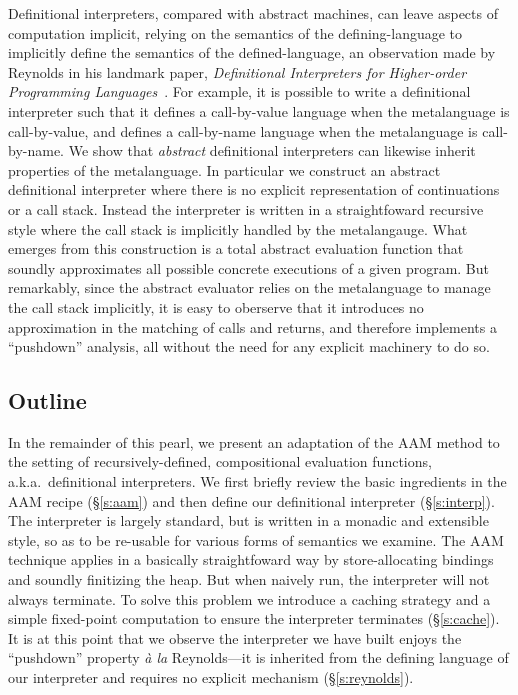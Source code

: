 Definitional interpreters, compared with abstract machines, can leave
aspects of computation implicit, relying on the semantics of the
defining-language to implicitly define the semantics of the
defined-language, an observation made by Reynolds in his landmark
paper, \emph{Definitional Interpreters for Higher-order Programming
  Languages}~\cite{dvanhorn:reynolds-acm72}.  For example, it is
possible to write a definitional interpreter such that it defines a
call-by-value language when the metalanguage is call-by-value, and
defines a call-by-name language when the metalanguage is call-by-name.
We show that \emph{abstract} definitional interpreters can likewise
inherit properties of the metalanguage.  In particular we construct an
abstract definitional interpreter where there is no explicit
representation of continuations or a call stack.  Instead the
interpreter is written in a straightfoward recursive style where the
call stack is implicitly handled by the metalangauge.  What emerges
from this construction is a total abstract evaluation function that
soundly approximates all possible concrete executions of a given
program.  But remarkably, since the abstract evaluator relies on the
metalanguage to manage the call stack implicitly, it is easy to
oberserve that it introduces no approximation in the matching of calls
and returns, and therefore implements a ``pushdown'' analysis, all
without the need for any explicit machinery to do so.

\subsection*{Outline}

In the remainder of this pearl, we present an adaptation of the AAM
method to the setting of recursively-defined, compositional evaluation
functions, a.k.a.~definitional interpreters.  We first briefly review
the basic ingredients in the AAM recipe (\S\ref{s:aam}) and then
define our definitional interpreter (\S\ref{s:interp}).  The
interpreter is largely standard, but is written in a monadic and
extensible style, so as to be re-usable for various forms of semantics
we examine.  The AAM technique applies in a basically straightfoward
way by store-allocating bindings and soundly finitizing the heap.  But
when naively run, the interpreter will not always terminate.  To solve
this problem we introduce a caching strategy and a simple fixed-point
computation to ensure the interpreter terminates (\S\ref{s:cache}).
It is at this point that we observe the interpreter we have built
enjoys the ``pushdown'' property \emph{\`a la} Reynolds---it is
inherited from the defining language of our interpreter and requires
no explicit mechanism (\S\ref{s:reynolds}).


